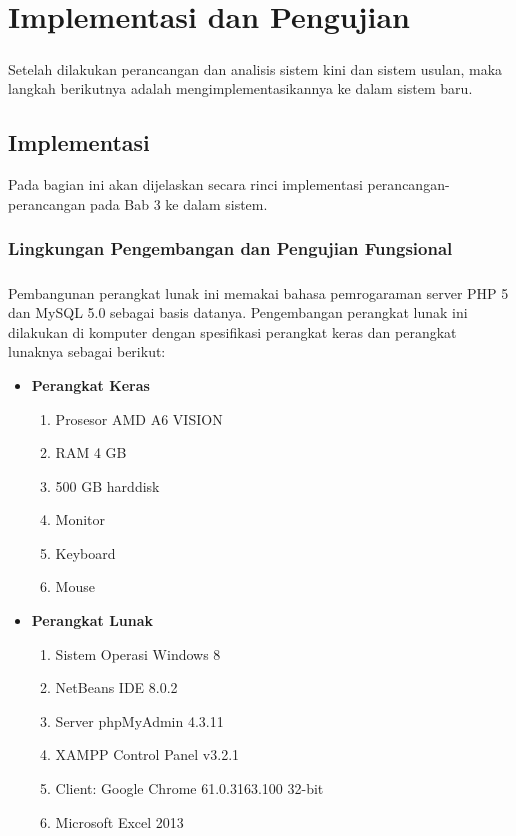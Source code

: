 \chapter{Implementasi dan Pengujian}
\label{chap:implementasiDanPengujian}
\setcounter{secnumdepth}{3}
\paragraph{}Setelah dilakukan perancangan dan analisis sistem kini dan sistem usulan, maka langkah berikutnya adalah mengimplementasikannya ke dalam sistem baru.
\section{Implementasi}
Pada bagian ini akan dijelaskan secara rinci implementasi perancangan-perancangan pada Bab 3 ke dalam sistem.
\subsection{Lingkungan Pengembangan dan Pengujian Fungsional}
\paragraph{} Pembangunan perangkat lunak ini memakai bahasa pemrogaraman server PHP 5 dan MySQL 5.0 sebagai basis datanya. Pengembangan perangkat lunak ini dilakukan di komputer dengan spesifikasi perangkat keras dan perangkat lunaknya sebagai berikut:
\begin{itemize}
\item \textbf{Perangkat Keras}
\begin{enumerate}
	\item Prosesor AMD A6 VISION
	\item RAM 4 GB
	\item 500 GB harddisk
	\item Monitor
	\item Keyboard
	\item Mouse
\end{enumerate}
\item \textbf{Perangkat Lunak}
\begin{enumerate}
	\item Sistem Operasi Windows 8
	\item NetBeans IDE 8.0.2
	\item Server phpMyAdmin 4.3.11
	\item XAMPP Control Panel v3.2.1
	\item Client: Google Chrome 61.0.3163.100 32-bit
	\item Microsoft Excel 2013
\end{enumerate}

\end{itemize}
